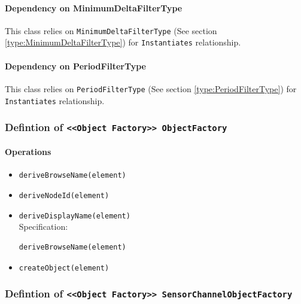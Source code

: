 \paragraph{Dependency on MinimumDeltaFilterType}

This class relies on \texttt{MinimumDeltaFilterType} (See section \ref{type:MinimumDeltaFilterType}) for \texttt{Instantiates} relationship.

\paragraph{Dependency on PeriodFilterType}

This class relies on \texttt{PeriodFilterType} (See section \ref{type:PeriodFilterType}) for \texttt{Instantiates} relationship.

\FloatBarrier
\subsubsection{Defintion of \texttt{<<Object Factory>> ObjectFactory}} \label{type:ObjectFactory}

\FloatBarrier



\paragraph{Operations}
\begin{itemize}
  \item \texttt{deriveBrowseName(element)}
  \item \texttt{deriveNodeId(element)}
  \item \texttt{deriveDisplayName(element)}\\
    Specification:
   \indent \begin{Verbatim}[xleftmargin=.25in,fontsize=\small]
deriveBrowseName(element)
\end{Verbatim}

  \item \texttt{createObject(element)}
\end{itemize}
\FloatBarrier
\subsubsection{Defintion of \texttt{<<Object Factory>> SensorChannelObjectFactory}} \label{type:SensorChannelObjectFactory}

\FloatBarrier



